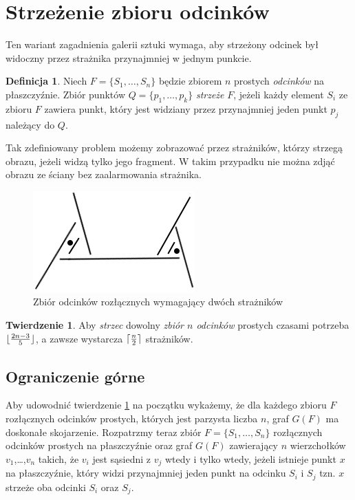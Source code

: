 \documentclass[brudnopis]{xmgr}
\DeclarePairedDelimiter\ceil{\lceil}{\rceil}
\DeclarePairedDelimiter\floor{\lfloor}{\rfloor}
\theoremstyle{definition}
\newtheorem{Twierdzenie}{Twierdzenie}
\newtheorem{Definicja}{Definicja}
\begin{document}
\section{Strzeżenie zbioru odcinków}
Ten wariant zagadnienia galerii sztuki wymaga, aby strzeżony odcinek był widoczny przez strażnika przynajmniej w jednym punkcie. 
\begin{Definicja}
Niech $F = \{S_1,\ldots,S_n\}$ będzie zbiorem $n$ prostych \emph{odcinków} na płaszczyźnie. Zbiór punktów $Q = \{p_1,\ldots,p_k\}$ \emph{strzeże} $F$, jeżeli każdy element $S_i$ ze zbioru $F$ zawiera punkt, który jest widziany przez przynajmniej jeden punkt $p_j$ należący do $Q$.
\end{Definicja}
Tak zdefiniowany problem możemy zobrazować przez strażników, którzy strzegą obrazu, jeżeli widzą tylko jego fragment. W takim przypadku nie można zdjąć obrazu ze ściany bez zaalarmowania strażnika.
\begin{figure}[ht!]
 \centering
  \includegraphics{rysunki/rozlaczny_dwoch_straznikow.png}
  \caption{Zbiór odcinków rozłącznych wymagający dwóch strażników}
\end{figure} 

\begin{Twierdzenie} \label{straznicy strzezenie} \cite{illumination}
Aby \emph{strzec} dowolny \emph{zbiór $n$ odcinków} prostych czasami potrzeba $\floor{\frac{2n-3}{5}}$, a zawsze wystarcza $\ceil{\frac{n}{2}}$ strażników.
\end{Twierdzenie}

\subsection{Ograniczenie górne}
Aby udowodnić twierdzenie \ref{straznicy strzezenie} na początku wykażemy, że dla każdego zbioru $F$ rozłącznych odcinków prostych, których jest parzysta liczba $n$, graf $G(F)$ ma doskonałe skojarzenie.
Rozpatrzmy teraz zbiór $F =\{S_1,\ldots,S_n\}$ rozłącznych odcinków prostych na płaszczyźnie oraz graf $G(F)$ zawierający $n$ wierzchołków $v_1$,\ldots,$v_n$ takich, że $v_i$ jest sąsiedni z $v_j$ wtedy i tylko wtedy, jeżeli istnieje punkt $x$ na płaszczyźnie, który widzi przynajmniej jeden punkt na odcinku $S_i$ i $S_j$ tzn. $x$ strzeże oba odcinki $S_i$ oraz $S_j$.
\end{document}
